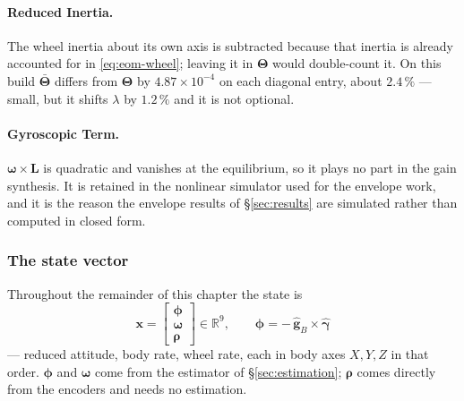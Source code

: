 \paragraph{Reduced Inertia.} The wheel inertia about
its own axis is subtracted because that inertia is already accounted for in
\eqref{eq:eom-wheel}; leaving it in $\bm{\Theta}$ would double-count it. On
this build $\bar{\bm{\Theta}}$ differs from $\bm{\Theta}$ by
$4.87\times10^{-4}$ on each diagonal entry, about $2.4\,\%$ --- small, but it
shifts $\lambda$ by $1.2\,\%$ and it is not optional.

\paragraph{Gyroscopic Term.} $\bm{\omega}\times
\bm{L}$ is quadratic and vanishes at the equilibrium, so it plays no part in
the gain synthesis. It is retained in the nonlinear simulator used for the
envelope work, and it is the reason the envelope results of
\S\ref{sec:results} are simulated rather than computed in closed form.

\subsubsection{The state vector}
\label{sec:state-vector}

Throughout the remainder of this chapter the state is
%
\begin{equation}
  \boxed{\;
  \bm{x} = \begin{bmatrix}\bm{\phi}\\[0.15em] \bm{\omega}\\[0.15em]
                          \bm{\rho}\end{bmatrix}\in\mathbb{R}^{9},
  \qquad
  \bm{\phi} = -\,\hat{\bm{g}}_B\times\hat{\bm{\gamma}}
  \;}
  \label{eq:state}
\end{equation}
%
--- reduced attitude, body rate, wheel rate, each in body axes $X,Y,Z$ in
that order. $\bm{\phi}$ and $\bm{\omega}$ come from the estimator of
\S\ref{sec:estimation}; $\bm{\rho}$ comes directly from the encoders and
needs no estimation.

